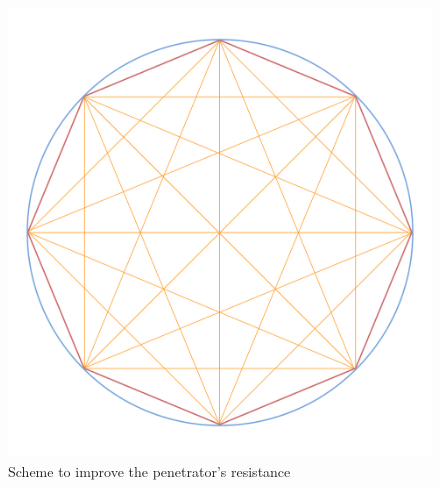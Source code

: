 \begin{figure}[H]
\centering
\includegraphics[scale=1]{figures/Paul/pattern.png}
\caption{Scheme to improve the penetrator's resistance}
\label{patternpene}
\end{figure}


